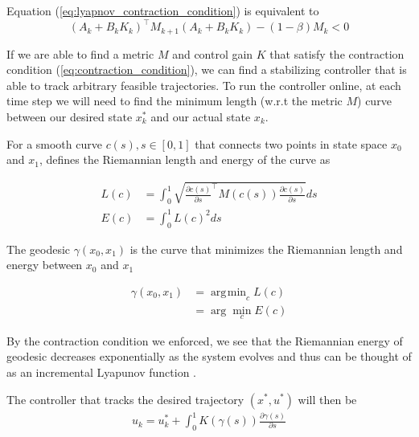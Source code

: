 \documentclass[journal]{IEEEtran}
\DeclareMathOperator*{\argmin}{\arg\!\min}
\begin{document}
Equation (\ref{eq:lyapnov_contraction_condition}) is equivalent to
\begin{equation}
	\label{eq:contraction_condition}
	(A_k + B_k K_k)^\top M_{k+1} (A_k + B_k K_k) - (1 - \beta) M_k < 0
\end{equation}

If we are able to find a metric $M$ and control gain $K$ that satisfy the contraction condition (\ref{eq:contraction_condition}), we can find a stabilizing controller that is able to track arbitrary feasible trajectories. To run the controller online, at each time step we will need to find the minimum length (w.r.t the metric $M$) curve between our desired state $x^*_k$ and our actual state $x_k$.

For a smooth curve $c(s), s\in [0, 1]$ that connects two points in state space $x_0$ and $x_1$, \autocite{manchesterControlContractionMetrics2017} defines the Riemannian length and energy of the curve as

\begin{equation}
	\begin{aligned}
		L(c) &= \int_0^1 \sqrt{\frac{\partial{c(s)}}{\partial{s}} ^\top M(c(s)) \frac{\partial{c(s)}}{\partial{s}}} ds \\
		E(c) &= \int_0^1 L(c)^2 ds
	\end{aligned}
	\label{eq:geodesic_length_energy}
\end{equation}

The geodesic $\gamma(x_0, x_1)$ is the curve that minimizes the Riemannian length and energy between $x_0$ and $x_1$

\begin{equation}
	\begin{aligned}
		\gamma(x_0, x_1) &= \argmin_{c} L(c) \\
		&= \arg \min_{c} E(c)
	\end{aligned}
	\label{eq:geodesic}
\end{equation}

By the contraction condition we enforced, we see that the Riemannian energy of geodesic decreases exponentially as the system evolves and thus can be thought of as an incremental Lyapunov function \autocite{manchesterControlContractionMetrics2017}.

The controller that tracks the desired trajectory $(x^*, u^*)$ will then be
\begin{equation}
	\begin{aligned}
		u_k = u^*_k + \int_0^1 K(\gamma(s))\frac{\partial{\gamma(s)}}{\partial{s}}
	\end{aligned}
	\label{eq:control_integral_geodesic}
\end{equation}
\end{document}
